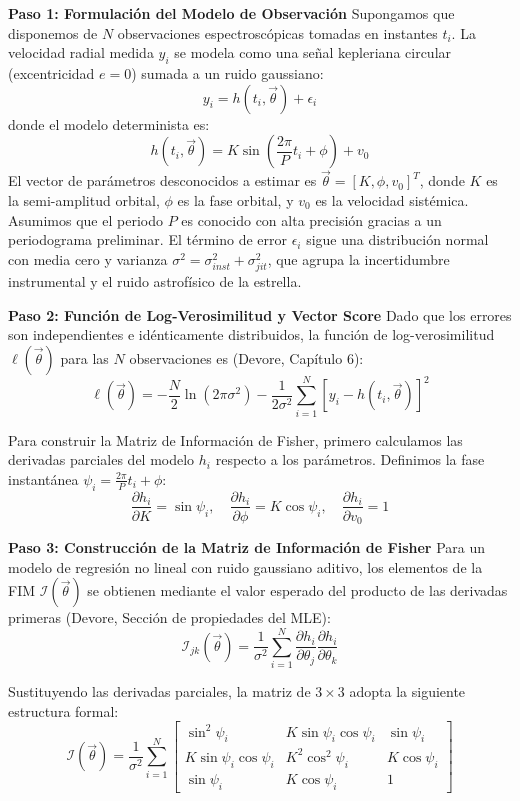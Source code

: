 \textbf{Paso 1: Formulación del Modelo de Observación}
Supongamos que disponemos de $N$ observaciones espectroscópicas tomadas en instantes $t_i$. La velocidad radial medida $y_i$ se modela como una señal kepleriana circular (excentricidad $e=0$) sumada a un ruido gaussiano:
$$ y_i = h(t_i, \vec{\theta}) + \epsilon_i $$
donde el modelo determinista es:
$$ h(t_i, \vec{\theta}) = K \sin\left( \frac{2\pi}{P} t_i + \phi \right) + v_0 $$
El vector de parámetros desconocidos a estimar es $\vec{\theta} = [K, \phi, v_0]^T$, donde $K$ es la semi-amplitud orbital, $\phi$ es la fase orbital, y $v_0$ es la velocidad sistémica. Asumimos que el periodo $P$ es conocido con alta precisión gracias a un periodograma preliminar. El término de error $\epsilon_i$ sigue una distribución normal con media cero y varianza $\sigma^2 = \sigma_{inst}^2 + \sigma_{jit}^2$, que agrupa la incertidumbre instrumental y el ruido astrofísico de la estrella.

\textbf{Paso 2: Función de Log-Verosimilitud y Vector Score}
Dado que los errores son independientes e idénticamente distribuidos, la función de log-verosimilitud $\ell(\vec{\theta})$ para las $N$ observaciones es (Devore, Capítulo 6):
$$ \ell(\vec{\theta}) = -\frac{N}{2} \ln(2\pi\sigma^2) - \frac{1}{2\sigma^2} \sum_{i=1}^N \left[ y_i - h(t_i, \vec{\theta}) \right]^2 $$

Para construir la Matriz de Información de Fisher, primero calculamos las derivadas parciales del modelo $h_i$ respecto a los parámetros. Definimos la fase instantánea $\psi_i = \frac{2\pi}{P} t_i + \phi$:
$$ \frac{\partial h_i}{\partial K} = \sin\psi_i, \quad \frac{\partial h_i}{\partial \phi} = K \cos\psi_i, \quad \frac{\partial h_i}{\partial v_0} = 1 $$

\textbf{Paso 3: Construcción de la Matriz de Información de Fisher}
Para un modelo de regresión no lineal con ruido gaussiano aditivo, los elementos de la FIM $\mathcal{I}(\vec{\theta})$ se obtienen mediante el valor esperado del producto de las derivadas primeras (Devore, Sección de propiedades del MLE):
$$ \mathcal{I}_{jk}(\vec{\theta}) = \frac{1}{\sigma^2} \sum_{i=1}^N \frac{\partial h_i}{\partial \theta_j} \frac{\partial h_i}{\partial \theta_k} $$

Sustituyendo las derivadas parciales, la matriz de $3 \times 3$ adopta la siguiente estructura formal:
$$ \mathcal{I}(\vec{\theta}) = \frac{1}{\sigma^2} \sum_{i=1}^N \begin{bmatrix} 
\sin^2\psi_i & K\sin\psi_i\cos\psi_i & \sin\psi_i \\ 
K\sin\psi_i\cos\psi_i & K^2\cos^2\psi_i & K\cos\psi_i \\ 
\sin\psi_i & K\cos\psi_i & 1 
\end{bmatrix} $$

